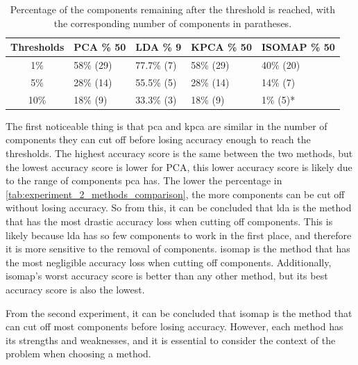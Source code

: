 \begin{table}[htb!]
    \centering
    \begin{tabular}{cp{}p{}p{}p{}}
        \toprule
        \textbf{Thresholds} & \textbf{PCA \% 50} & \textbf{LDA \% 9} & \textbf{KPCA \% 50} & \textbf{ISOMAP \% 50} \\ \midrule
        1\%                 & 58\% (29)          & 77.7\% (7)        & 58\% (29)           & 40\% (20)             \\
        5\%                 & 28\% (14)          & 55.5\% (5)        & 28\% (14)           & 14\% (7)              \\
        10\%                & 18\% (9)           & 33.3\% (3)        & 18\% (9)            & 1\% (5)*              \\
        \bottomrule
    \end{tabular}
    \caption{Percentage of the components remaining after the threshold is reached, with the corresponding number of components in paratheses.}
    \label{tab:experiment_2_methods_comparison}
\end{table}

The first noticeable thing is that \gls{pca} and \gls{kpca} are similar in the number of components they can cut off before losing accuracy enough to reach the thresholds. The highest accuracy score is the same between the two methods, but the lowest accuracy score is lower for PCA, this lower accuracy score is likely due to the range of components \gls{pca} has.  The lower the percentage in \autoref{tab:experiment_2_methods_comparison}, the more components can be cut off without losing accuracy. So from this, it can be concluded that \gls{lda} is the method that has the most drastic accuracy loss when cutting off components. This is likely because \gls{lda} has so few components to work in the first place, and therefore it is more sensitive to the removal of components. \gls{isomap} is the method that has the most negligible accuracy loss when cutting off components. Additionally, \gls{isomap}'s worst accuracy score is better than any other method, but its best accuracy score is also the lowest.

From the second experiment, it can be concluded that \gls{isomap} is the method that can cut off most components before losing accuracy. However, each method has its strengths and weaknesses, and it is essential to consider the context of the problem when choosing a method.



